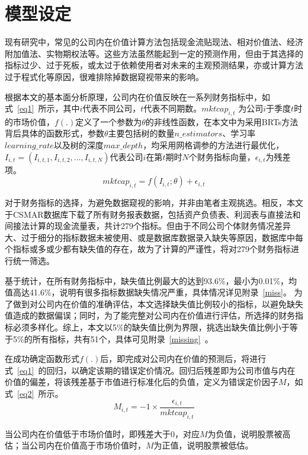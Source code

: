 \section{模型设定}
现有研究中，常见的公司内在价值计算方法包括现金流贴现法、相对价值法、经济附加值法、实物期权法等。这些方法虽然能起到一定的预测作用，但由于其选择的指标过少、过于死板，或太过于依赖使用者对未来的主观预测结果，亦或计算方法过于程式化等原因，很难排除掉数据窥视带来的影响。

根据本文的基本面分析原理，公司内在价值反映在一系列财务指标中，如式~\ref{eq1}~所示，其中$i$代表不同公司，$t$代表不同期数。$mktcap_{i, t}$ 为公司$i$于季度$t$时的市场价值，$f(.)$定义了一个参数为$\theta$的非线性函数，在本文中为采用BRTs方法背后具体的函数形式，参数$\theta$主要包括树的数量$n\_estimators$、学习率$learning\_rate$以及树的深度$max\_depth$，均采用网格调参的方法进行最优化，$ I_{i, t}=( I_{i, t,1},I_{i, t,2},...,I_{i, t,N})$代表公司$i$在第$t$期时$N$个财务指标向量，$\epsilon_{i, t}$为残差项。
\begin{equation}
\label{eq1}
mktcap_{i, t} =f(I_{i, t};\theta)+\epsilon_{i, t} 
\end{equation}

对于财务指标的选择，为避免数据窥视的影响，并非由笔者主观挑选。相反，本文于CSMAR数据库下载了所有财务报表数据，包括资产负债表、利润表与直接法和间接法计算的现金流量表，共计279个指标。但由于不同公司个体财务情况差异大、过于细分的指标数据未被使用、或是数据库数据录入缺失等原因，数据库中每个指标或多或少都有缺失值的存在，故为了计算的严谨性，将对279个财务指标进行统一筛选。

基于统计，在所有财务指标中，缺失值比例最大的达到93.6\%，最小为0.01\%，均值高达41.6\%，说明有很多指标数据缺失情况严重，具体情况详见附录~\ref{miss}。
为了做到对公司内在价值的准确评估，本文选择缺失值比例较小的指标，以避免缺失值造成的数据偏误\cite{yanFundamentalAnalysisCrossSection2017a}；同时，为了能完整对公司内在价值进行评估，所选择的财务指标必须多样化。综上，本文以5\%的缺失值比例为界限，挑选出缺失值比例小于等于5\%的所有指标，共有51个，具体可见附录~\ref{missing}~。

在成功确定函数形式$f(.)$后，即完成对公司内在价值的预测后，将进行式~\ref{eq1}~的回归，以确定该期的错误定价情况。回归后残差即为公司市值与内在价值的偏差，将该残差基于市值进行标准化后的负值，定义为错误定价因子$M$，如式~\ref{eq2}~所示。
\begin{equation}
\label{eq2}
M_{i, t} =-1 \times \frac{\epsilon_{i, t}}{mktcap_{i, t}}
\end{equation}

当公司内在价值低于市场价值时，即残差大于0，对应$M$为负值，说明股票被高估；当公司内在价值高于市场价值时，$M$为正值，说明股票被低估。

